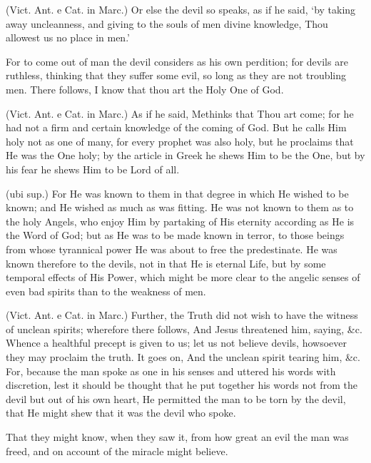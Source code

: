  (Vict. Ant. e Cat. in Marc.) Or else the devil so speaks, as if he said, ‘by taking away uncleanness, and giving to the souls of men divine knowledge, Thou allowest us no place in men.’

 For to come out of man the devil considers as his own perdition; for devils are ruthless, thinking that they suffer some evil, so long as they are not troubling men. There follows, I know that thou art the Holy One of God.

 (Vict. Ant. e Cat. in Marc.) As if he said, Methinks that Thou art come; for he had not a firm and certain knowledge of the coming of God. But he calls Him holy not as one of many, for every prophet was also holy, but he proclaims that He was the One holy; by the article in Greek he shews Him to be the One, but by his fear he shews Him to be Lord of all.

 (ubi sup.) For He was known to them in that degree in which He wished to be known; and He wished as much as was fitting. He was not known to them as to the holy Angels, who enjoy Him by partaking of His eternity according as He is the Word of God; but as He was to be made known in terror, to those beings from whose tyrannical power He was about to free the predestinate. He was known therefore to the devils, not in that He is eternal Life, but by some temporal effects of His Power, which might be more clear to the angelic senses of even bad spirits than to the weakness of men.

 (Vict. Ant. e Cat. in Marc.) Further, the Truth did not wish to have the witness of unclean spirits; wherefore there follows, And Jesus threatened him, saying, \&c. Whence a healthful precept is given to us; let us not believe devils, howsoever they may proclaim the truth. It goes on, And the unclean spirit tearing him, \&c. For, because the man spoke as one in his senses and uttered his words with discretion, lest it should be thought that he put together his words not from the devil but out of his own heart, He permitted the man to be torn by the devil, that He might shew that it was the devil who spoke.

 That they might know, when they saw it, from how great an evil the man was freed, and on account of the miracle might believe.

